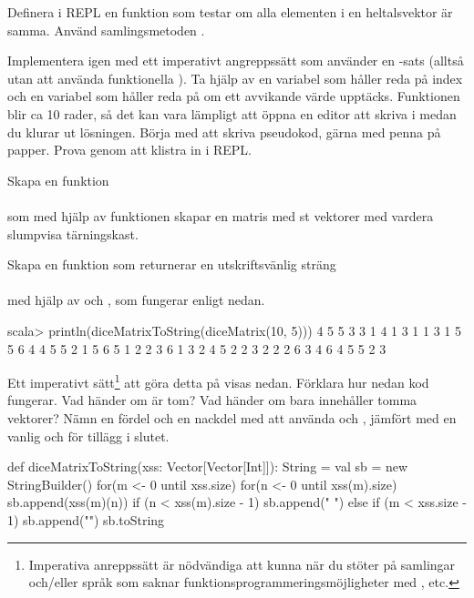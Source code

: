 \Subtask Definera i REPL en funktion  som testar om alla elementen i en heltalsvektor är samma. Använd samlingsmetoden .


\Subtask Implementera  igen med ett imperativt angreppssätt som använder en -sats (alltså utan att använda funktionella  ). Ta hjälp av en variabel  som håller reda på index och en variabel  som håller reda på om ett avvikande värde upptäcks. Funktionen blir ca 10 rader, så det kan vara lämpligt att öppna en editor att skriva i medan du klurar ut lösningen. Börja med att skriva pseudokod, gärna med penna på papper. Prova genom att klistra in i REPL.



\Subtask Skapa en funktion  \\  \\ som med hjälp av funktionen  skapar en matris med  st vektorer med vardera  slumpvisa tärningskast.


\Subtask Skapa en funktion som returnerar en utskriftsvänlig sträng \\  \\med hjälp av  och , som fungerar enligt nedan.
\begin{REPL}
scala> println(diceMatrixToString(diceMatrix(10, 5)))
4 5 5 3 3
1 4 1 3 1
1 3 1 5 5
6 4 4 5 5
2 1 5 6 5
1 2 2 3 6
1 3 2 4 5
2 2 3 2 2
2 6 3 4 6
4 5 5 2 3

\end{REPL}



\Subtask\Pen Ett imperativt sätt\footnote{Imperativa anreppssätt är nödvändiga att kunna när du stöter på samlingar och/eller språk som saknar funktionsprogrammeringsmöjligheter med ,  etc.} att göra detta på visas nedan. Förklara hur nedan kod fungerar. Vad händer om  är tom? Vad händer om  bara innehåller tomma vektorer? Nämn en fördel och en nackdel med att använda  och , jämfört med en vanlig  och \code{+} för tillägg i slutet.
\begin{Code}
def diceMatrixToString(xss: Vector[Vector[Int]]): String = {
  val sb = new StringBuilder()
  for(m <- 0 until xss.size) {
    for(n <- 0 until xss(m).size) {
      sb.append(xss(m)(n))
      if (n < xss(m).size - 1) sb.append(" ")
      else if (m < xss.size - 1) sb.append("\n")
    }
  }
  sb.toString
}
\end{Code}

